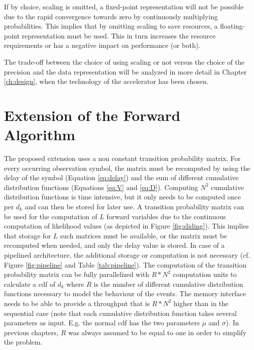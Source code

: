\documentclass[mscthesis]{usiinfthesis}
\begin{document}
If by choice, scaling is omitted, a fixed-point representation will not be
possible due to the rapid convergence towards zero by continuously multiplying
probabilities. This implies that by omitting scaling to save resources,
a floating-point representation must be used. This in turn increases the
resource requirements or has a negative impact on performance (or both).

The trade-off between the choice of using scaling or not versus the choice of
the precision and the data representation will be analyzed in more detail in
Chapter \ref{ch:design}, when the technology of the accelerator has been
chosen.

\section{Extension of the Forward Algorithm}
\label{ch:analysis_extension}

The proposed extension uses a non constant transition probability matrix. For
every occurring observation symbol, the matrix must be recomputed by using the
delay of the symbol (Equation \ref{eq:delay}) and the sum of different
cumulative distribution functions (Equations \ref{eq:V} and \ref{eq:D}).
Computing $N^2$ cumulative distribution functions is time intensive, but it only
needs to be computed once per $d_k$ and can then be stored for later use.
A transition probability matrix can be used for the computation of $L$ forward
variables due to the continuous computation of likelihood values (as depicted
in Figure \ref{fig:sliding}). This implies that storage for $L$ such matrices
must be available, or the matrix must be recomputed when needed, and only the
delay value is stored. In case of a pipelined architecture, the additional
storage or computation is not necessary (cf. Figure \ref{fig:pipeline} and
Table \ref{tab:pipeline}). The computation of the transition probability matrix
can be fully parallelized with $R*N^2$ computation units to calculate
a \gls{cdf} of $d_k$ where $R$ is the number of different cumulative
distribution functions necessary to model the behaviour of the events. The
memory interface needs to be able to provide a throughput that is $R*N^2$
higher than in the sequential case (note that each cumulative distribution
function takes several parameters as input. E.g. the normal \gls{cdf} has the
two parameters $\mu$ and $\sigma$). In previous chapters, $R$ was always
assumed to be equal to one in order to simplify the problem.
\end{document}

